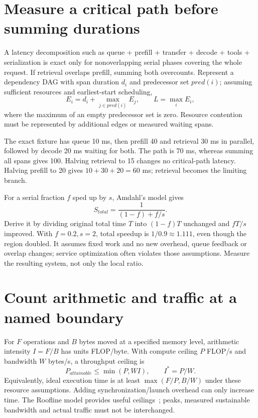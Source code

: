 \section{Measure a critical path before summing durations}
\label{evod47:path}
A latency decomposition such as queue + prefill + transfer + decode + tools
+ serialization is exact only for nonoverlapping serial phases covering the
whole request. If retrieval overlaps prefill, summing both overcounts.
Represent a dependency DAG with span duration $d_i$ and predecessor set
$pred(i)$; assuming sufficient resources and earliest-start scheduling,
\[
 E_i=d_i+\max_{j\in pred(i)}E_j,\qquad
 L=\max_i E_i,
\]
where the maximum of an empty predecessor set is zero. Resource contention
must be represented by additional edges or measured waiting spans.

The exact fixture has queue 10 ms, then prefill 40 and retrieval 30 ms in
parallel, followed by decode 20 ms waiting for both. The path is 70 ms,
whereas summing all spans gives 100. Halving retrieval to 15 changes no
critical-path latency. Halving prefill to 20 gives $10+30+20=60$ ms; retrieval
becomes the limiting branch.


For a serial fraction $f$ sped up by $s$, Amdahl's model gives
\[
 S_{total}=\frac{1}{(1-f)+f/s}.
\]
Derive it by dividing original total time $T$ into $(1-f)T$ unchanged and
$fT/s$ improved. With $f=0.2,s=2$, total speedup is $1/0.9\approx1.111$,
even though the region doubled. It assumes fixed work and no new overhead,
queue feedback or overlap changes; service optimization often violates those
assumptions. Measure the resulting system, not only the local ratio.

\section{Count arithmetic and traffic at a named boundary}
\label{evod47:roofline}
For $F$ operations and $B$ bytes moved at a specified memory level,
arithmetic intensity $I=F/B$ has units FLOP/byte. With compute ceiling $P$
FLOP/s and bandwidth $W$ bytes/s, a throughput ceiling is
\[
 P_{attainable}\le\min(P,WI),\qquad I^*=P/W.
\]
Equivalently, ideal execution time is at least $\max(F/P,B/W)$ under these
resource assumptions. Adding synchronization/launch overhead can only increase
time. The Roofline model provides useful ceilings~\cite{roofline47}; peaks,
measured sustainable bandwidth and actual traffic must not be interchanged.

